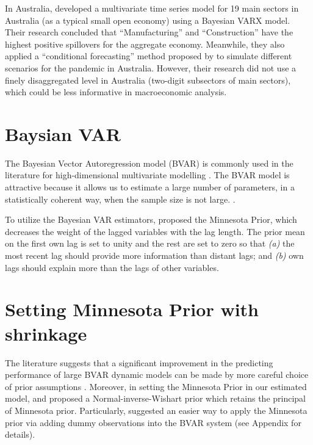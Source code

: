 \documentclass{monashthesis}
\begin{document}
In Australia, \textcite{anderson2020} developed a multivariate time series model for 19 main sectors in Australia (as a typical small open economy) using a Bayesian VARX model. Their research concluded that ``Manufacturing'' and ``Construction'' have the highest positive spillovers for the aggregate economy. Meanwhile, they also applied a ``conditional forecasting'' method proposed by \textcite{waggoner1999} to simulate different scenarios for the pandemic in Australia. However, their research did not use a finely disaggregated level in Australia (two-digit subsectors of main sectors), which could be less informative in macroeconomic analysis.

\hypertarget{baysian-var}{%
\section{Baysian VAR}\label{baysian-var}}

The Bayesian Vector Autoregression model (BVAR) is commonly used in the literature for high-dimensional multivariate modelling \autocites[e.g.][]{anderson2020,litterman1986,banbura2010large}. The BVAR model is attractive because it allows us to estimate a large number of parameters, in a statistically coherent way, when the sample size is not large. \autocite{litterman1986,wozniak2016bayesian}.

To utilize the Bayesian VAR estimators, \textcite{litterman1979} proposed the Minnesota Prior, which decreases the weight of the lagged variables with the lag length. The prior mean on the first own lag is set to unity and the rest are set to zero so that \emph{(a)} the most recent lag should provide more information than distant lags; and \emph{(b)} own lags should explain more than the lags of other variables.

\hypertarget{setting-minnesota-prior-with-shrinkage}{%
\section{Setting Minnesota Prior with shrinkage}\label{setting-minnesota-prior-with-shrinkage}}

The literature suggests that a significant improvement in the predicting performance of large BVAR dynamic models can be made by more careful choice of prior assumptions \autocite{banbura2010large,litterman1986}. Moreover, in setting the Minnesota Prior in our estimated model, \textcite{robertson1999vector} and \textcite{kadiyala1997} proposed a Normal-inverse-Wishart prior which retains the principal of Minnesota prior. Particularly, \textcite{banbura2010large} suggested an easier way to apply the Minnesota prior via adding dummy observations into the BVAR system (see Appendix for details).
\end{document}
